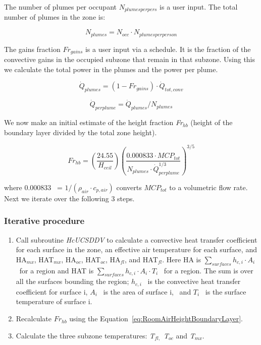 The number of plumes per occupant \({N_{plumesperpers}}\) is a user input. The total number of plumes in the zone is:

\begin{equation}
{N_{plumes}} = {N_{occ}} \cdot {N_{plumesperperson}}
\end{equation}

The gains fraction \(F{r_{gains}}\) is a user input via a schedule. It is the fraction of the convective gains in the occupied subzone that remain in that subzone. Using this we calculate the total power in the plumes and the power per plume.

\begin{equation}
{\dot Q_{plumes}} = (1 - F{r_{gains}}) \cdot {\dot Q_{tot,conv}}
\end{equation}

\begin{equation}
{\dot Q_{perplume}} = {\dot Q_{plumes}}/{N_{plumes}}
\end{equation}

We now make an initial estimate of the height fraction \emph{Fr\(_{hb}\)} (height of the boundary layer divided by the total zone height).

\begin{equation}
F{r_{hb}} = \left( {{\frac{{24.55}}{{H_{ceil}}}}} \right){\left( {\frac{{0.000833 \cdot MC{P_{tot}}}}{{{N_{plumes}} \cdot \dot Q_{perplume}^{1/3}}}} \right)^{3/5}}
\label{eq:RoomAirHeightBoundaryLayer}
\end{equation}

where 0.000833~ = \(1/({\rho_{air}} \cdot {c_{p,air}})\) converts \(MC{P_{tot}}\) to a volumetric flow rate. Next we iterate over the following 3 steps.

\subsubsection{Iterative procedure}\label{iterative-procedure}

\begin{enumerate}
\item Call subroutine \emph{HcUCSDDV} to calculate a convective heat transfer coefficient for each surface in the zone, an effective air temperature for each surface, and HA\(_{mx}\), HAT\(_{mx}\), HA\(_{oc}\), HAT\(_{oc}\), HA\(_{fl}\), and HAT\(_{fl}\). Here HA is \(\sum\limits_{surfaces} {{h_{c,i}}} \cdot {A_i}\) ~for a region and HAT is \(\sum\limits_{surfaces} {{h_{c,i}}} \cdot {A_i} \cdot {T_i}\) ~for a region. The sum is over all the surfaces bounding the region; \({h_{c,i}}\) ~is the convective heat transfer coefficient for surface i, \({A_i}\) ~is the area of surface i,~ and \({T_i}\) ~is the surface temperature of surface i.
\item Recalculate \(F{r_{hb}}\) using the Equation~\ref{eq:RoomAirHeightBoundaryLayer}.
\item Calculate the three subzone temperatures: \emph{T\(_{fl,}\) T\(_{oc}\)} and \emph{T\(_{mx}\)}.
\end{enumerate}

